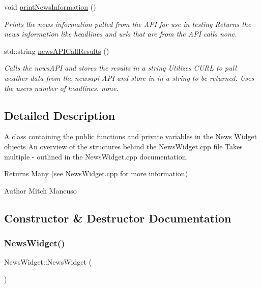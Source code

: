 \begin{DoxyCompactItemize}
void \mbox{\hyperlink{class_news_widget_a3a3c9dc6ec6d9e68bf9150ec109f3619}{print\+News\+Information}} ()
\begin{DoxyCompactList}\small\item\em Prints the news information pulled from the A\+PI for use in testing  Returns the news information like headlines and urls that are from the A\+PI calls  none. \end{DoxyCompactList}\item 
std\+::string \mbox{\hyperlink{class_news_widget_a514475c2b2c2f716aed06d0060efee7e}{news\+A\+P\+I\+Call\+Results}} ()
\begin{DoxyCompactList}\small\item\em Calls the news\+A\+PI and stores the results in a string  Utilizes C\+U\+RL to pull weather data from the newsapi A\+PI and store in in a string to be returned. Uses the user\textquotesingle{}s number of headlines.  none. \end{DoxyCompactList}\end{DoxyCompactItemize}


\subsection{Detailed Description}
A class containing the public functions and private variables in the News Widget objects  An overview of the structures behind the News\+Widget.\+cpp file  Takes multiple -\/ outlined in the News\+Widget.\+cpp documentation. 

\begin{DoxyReturn}{Returns}
Many (see News\+Widget.\+cpp for more information) 
\end{DoxyReturn}
\begin{DoxyAuthor}{Author}
Mitch Mancuso 
\end{DoxyAuthor}


\subsection{Constructor \& Destructor Documentation}
\mbox{\label{class_news_widget_a9437347c57951bcd319ee62012b154c7}} 
\subsubsection{\texorpdfstring{News\+Widget()}{NewsWidget()}}
{\footnotesize\ttfamily News\+Widget\+::\+News\+Widget (\begin{DoxyParamCaption}{ }\end{DoxyParamCaption})}



